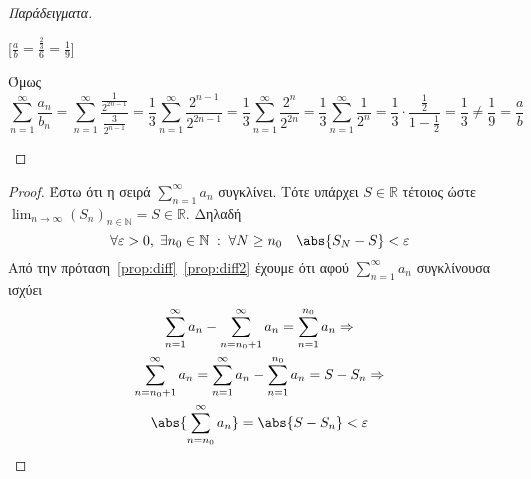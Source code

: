 \documentclass[main.tex]{subfiles}
\begin{document}
\begin{rem}
\begin{proof}[Παράδειγματα]
\begin{enumerate}[i)]
                [$ \frac{a}{b} = \frac{\frac{2}{3}}{6} = \frac{1}{9} $]

                Όμως 
                \[
                    \sum_{n=1}^{\infty} \frac{a_{n}}{b_{n}} = \sum_{n=1}^{\infty} 
                    \frac{\frac{1}{2^{2n-1}}}{\frac{3}{2^{n-1}}} = 
                    \frac{1}{3} \sum_{n=1}^{\infty} \frac{2^{n-1}}{2^{2n-1}} = 
                    \frac{1}{3} \sum_{n=1}^{\infty} \frac{2^{n}}{2^{2n}} = 
                    \frac{1}{3} \sum_{n=1}^{\infty} \frac{1}{2^{n}} = \frac{1}{3} \cdot 
                    \frac{\frac{1}{2}}{1 - \frac{1}{2}} = \frac{1}{3} \neq \frac{1}{9} 
                    = \frac{a}{b}
                \] 
        \end{enumerate}

    \end{proof}
\end{rem}


\begin{proof}
\item {}
    Έστω ότι η σειρά $ \sum_{n=1}^{\infty} a_{n} $ συγκλίνει. Τότε υπάρχει 
    $ S \in \mathbb{R} $ τέτοιος ώστε $ \lim_{n \to \infty} 
    {(S_{n})}_{n \in \mathbb{N}} = S \in \mathbb{R} $. Δηλαδή 
    \[
        \forall \varepsilon >0, \; \exists n_{0} \in \mathbb{N} \; : \; 
        \forall N \geq n_{0} \quad \abs{S_{N}-S} < \varepsilon 
    \] 
    Από την πρόταση~\ref{prop:diff}~\ref{prop:diff2} έχουμε ότι αφού 
    $ \sum_{n=1}^{\infty} a_{n} $ συγκλίνουσα ισχύει
    \begin{gather*}
        \sum_{n=1}^{\infty} a_{n} - \sum_{n= n_{0}+1}^{\infty} a_{n} = 
        \sum_{n= 1}^{n_{0}} a_{n} \Rightarrow \\ 
        \sum_{n= n_{0}+1}^{\infty} a_{n} = \sum_{n=1}^{\infty} a_{n} - 
        \sum_{n=1}^{n_{0}} a_{n} = S - S_{n} \Rightarrow \\
        \abs{\sum_{n= n_{0}}^{\infty} a_{n}} = \abs{S - S_{n}} < \varepsilon
    \end{gather*} 
\end{proof}

\end{document}
